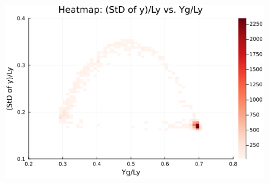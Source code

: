 \begin{figure}[H]
  \centering
  \includegraphics[scale=0.6]{image/RaRtmap_heat/2023-11-15T15:21:59.073__chi1.265_Ay50_rho0.4_T0.43_dT0.04_Rd0.0_Rt0.5_Ra1.877538_g0.0003999718779659611_run4.0e7_output.png}
  \label{}
\end{figure} 
